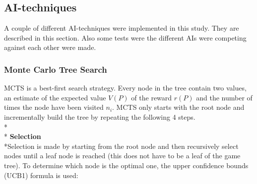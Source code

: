 \documentclass[journal]{vgtc}                %
\begin{document}
\subsection{AI-techniques}
A couple of different AI-techniques were implemented in this study. They are described in this section. Also some tests were the different AIs were competing against each other were made.
\subsubsection{Monte Carlo Tree Search}
MCTS is a best-first search strategy. Every node in the tree contain two values, an estimate of the expected value $V(P)$ of the reward $r(P)$ and the number of times the node have been visited $n_{i}$. MCTS only starts with the root node and incrementally build the tree by repeating the following 4 steps.\\*\\*
\textbf{Selection}
\\*Selection is made by starting from the root node and then recursively select nodes until a leaf node is reached (this does not have to be a leaf of the game tree). To determine which node is the optimal one, the upper confidence bounds (UCB1) formula is used: 
\end{document}
